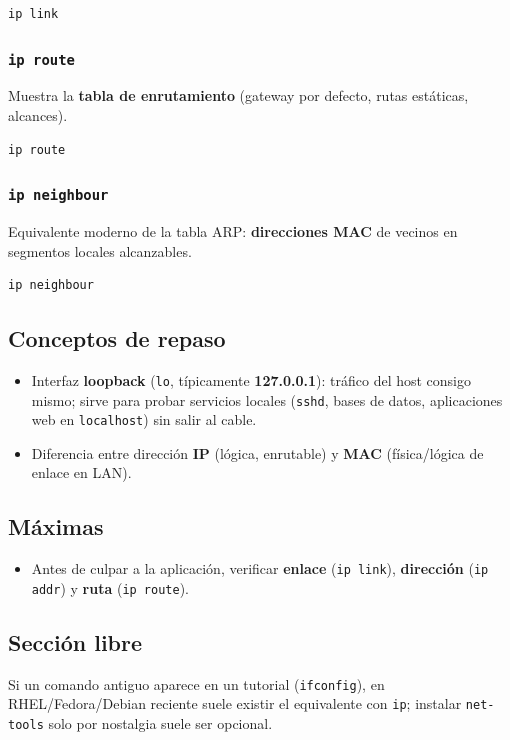 \documentclass[11pt, letterpaper]{article}
\begin{document}
\begin{verbatim}
ip link
\end{verbatim}
\subsubsection{\texttt{ip route}}
\label{sec:orge9ded82}
Muestra la \textbf{tabla de enrutamiento} (gateway por defecto, rutas estáticas, alcances).

\begin{verbatim}
ip route
\end{verbatim}
\subsubsection{\texttt{ip neighbour}}
\label{sec:org3763a58}
Equivalente moderno de la tabla ARP: \textbf{direcciones MAC} de vecinos en segmentos locales alcanzables.

\begin{verbatim}
ip neighbour
\end{verbatim}
\subsection{Conceptos de repaso}
\label{sec:orgc10bcb0}
\begin{itemize}
\item Interfaz \textbf{loopback} (\texttt{lo}, típicamente \textbf{127.0.0.1}): tráfico del host consigo mismo; sirve para probar servicios locales (\texttt{sshd}, bases de datos, aplicaciones web en \texttt{localhost}) sin salir al cable.
\item Diferencia entre dirección \textbf{IP} (lógica, enrutable) y \textbf{MAC} (física/lógica de enlace en LAN).
\end{itemize}
\subsection{Máximas}
\label{sec:org4e32fdf}
\begin{itemize}
\item Antes de culpar a la aplicación, verificar \textbf{enlace} (\texttt{ip link}), \textbf{dirección} (\texttt{ip addr}) y \textbf{ruta} (\texttt{ip route}).
\end{itemize}
\subsection{Sección libre}
\label{sec:orgb19889f}
Si un comando antiguo aparece en un tutorial (\texttt{ifconfig}), en RHEL/Fedora/Debian reciente suele existir el equivalente con \texttt{ip}; instalar \texttt{net-tools} solo por nostalgia suele ser opcional.
\end{document}
